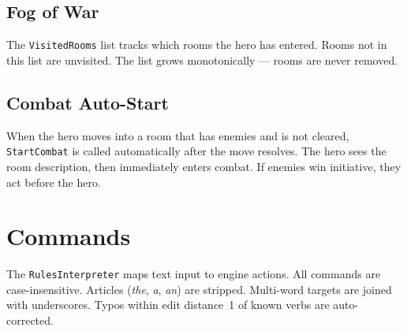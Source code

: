 \documentclass[a4paper,10pt]{article}
\newcommand{\field}[1]{\texttt{#1}}
\begin{document}
\subsection{Fog of War}

The \field{VisitedRooms} list tracks which rooms the hero has entered.
Rooms not in this list are unvisited. The list grows monotonically ---
rooms are never removed.

\subsection{Combat Auto-Start}

When the hero moves into a room that has enemies and is not cleared,
\texttt{StartCombat} is called automatically after the move resolves.
The hero sees the room description, then immediately enters combat.
If enemies win initiative, they act before the hero.

\section{Commands}

The \texttt{RulesInterpreter} maps text input to engine actions. All
commands are case-insensitive. Articles (\textit{the}, \textit{a},
\textit{an}) are stripped. Multi-word targets are joined with underscores.
Typos within edit distance~1 of known verbs are auto-corrected.
\end{document}
